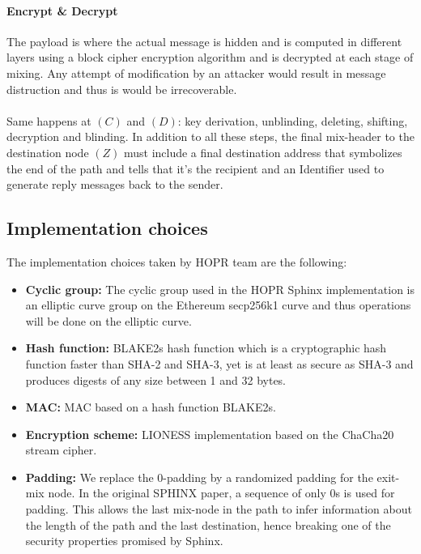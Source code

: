 \paragraph{Encrypt \& Decrypt}
The payload is where the actual message is hidden and is computed in different layers using a block cipher encryption algorithm and is decrypted at each stage of mixing. Any attempt of modification by an attacker would result in message distruction and thus is would be irrecoverable. 
\\~\\Same happens at $(C)$ and $(D)$: key derivation, unblinding, deleting, shifting, decryption and blinding. 
In addition to all these steps, the final mix-header to the destination node $(Z)$ must include a final destination address that symbolizes the end of the path and tells that it’s the recipient and an Identifier used to generate reply messages back to the sender.
\subsection*{Implementation choices}
The implementation choices taken by HOPR team are the following:
\begin{itemize}
    \item \textbf{Cyclic group:} The cyclic group used in the HOPR Sphinx implementation is an elliptic curve group on the Ethereum secp256k1 curve and thus operations will be done on the elliptic curve.
    \item \textbf{Hash function:} BLAKE2s hash function which is a cryptographic hash function faster than SHA-2 and SHA-3, yet is at least as secure as SHA-3 and produces digests of any size between 1 and 32 bytes.
    \item \textbf{MAC:} MAC based on a hash function BLAKE2s.
    \item \textbf{Encryption scheme:} LIONESS implementation based on the ChaCha20 stream cipher.
    \item \textbf{Padding:} We replace the 0-padding by a randomized padding for the exit-mix node. In the original SPHINX paper, a sequence of only 0s is used for padding. This allows the last mix-node in the path to infer information about the length of the path and the last destination, hence breaking one of the security properties promised by Sphinx.
\end{itemize}





